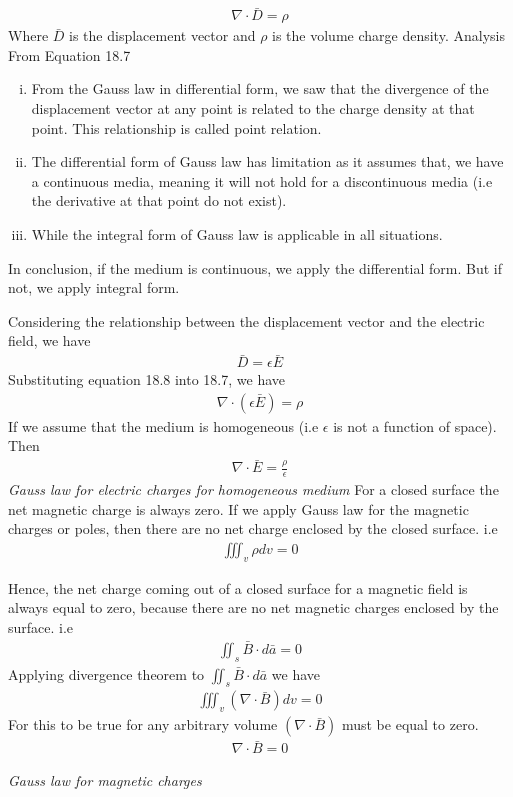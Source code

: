 \begin{align}
\boxed{\nabla \cdot \bar{D} = \rho}
\end{align}
Where $\bar{D}$ is the displacement vector and $\rho$ is the volume charge density.
Analysis From Equation 18.7
\begin{enumerate}[(i)]
\item From the Gauss law in differential form, we saw that the divergence of the displacement vector at any point is related to the charge density at that point. This relationship is called point relation.
\item The differential form of Gauss law has limitation as it assumes that, we have a continuous media, meaning it will not hold for a discontinuous media (i.e the derivative at that point do not exist).
\item While the integral form of Gauss law is applicable in all situations.
\end{enumerate}
In conclusion, if the medium is continuous, we apply the differential form. But if not, we apply integral form.

Considering the relationship between the displacement vector and the electric field, we have 
\begin{align}
\boxed{\bar{D} = \epsilon\bar{E}}
\end{align}
Substituting equation 18.8 into 18.7, we have
\begin{align*}
\nabla \cdot (\epsilon\bar{E}) = \rho
\end{align*}
If we assume that the medium is homogeneous (i.e $\epsilon$ is not a function of space). Then
\begin{align} 
\boxed{\nabla \cdot \bar{E} = \frac{\rho}{\epsilon}}
\end{align} 
\emph{Gauss law for electric charges for homogeneous medium}
For a closed surface the net magnetic charge is always zero. If we apply Gauss law for the magnetic charges or poles, then there are no net charge enclosed by the closed surface. i.e
\begin{align*}
\iiint_v\rho dv = 0
\end{align*}

Hence, the net charge coming out of a closed surface for a magnetic field is always equal to zero, because there are no net magnetic charges enclosed by the surface. i.e 
\begin{align*}
\iint_s\bar{B}\cdot d\bar{a} = 0
\end{align*}
Applying divergence theorem to $\iint_s\bar{B}\cdot d\bar{a}$ we have
\begin{align*}
\iiint_v(\nabla \cdot \bar{B})dv = 0
\end{align*}	
For this to be true for any arbitrary volume $(\nabla \cdot \bar{B})$ must be equal to zero.
\begin{align}
\boxed{\nabla \cdot \bar{B} = 0}
\end{align}
\begin{center}
\emph{Gauss law for magnetic charges}
\end{center}

